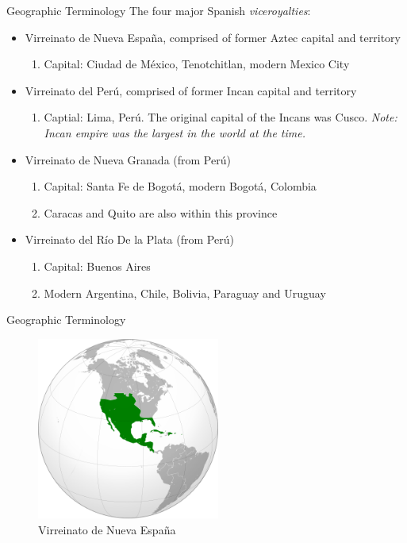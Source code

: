 \documentclass{beamer}
\begin{document}
\begin{frame}{Geographic Terminology}
\small
The four major Spanish \textit{viceroyalties}:
\begin{itemize}
\item Virreinato de Nueva Espa\~{n}a, comprised of former Aztec capital and territory
\begin{enumerate}
\item Capital: Ciudad de M\'{e}xico, Tenotchitlan, modern Mexico City
\end{enumerate}
\item Virreinato del Per\'{u}, comprised of former Incan capital and territory
\begin{enumerate}
\item Captial: Lima, Per\'{u}.  The original capital of the Incans was Cusco.  \textit{Note: Incan empire was the largest in the world at the time.}
\end{enumerate}
\item Virreinato de Nueva Granada (from Per\'{u})
\begin{enumerate}
\item Capital: Santa Fe de Bogot\'{a}, modern Bogot\'{a}, Colombia
\item Caracas and Quito are also within this province
\end{enumerate}
\item Virreinato del R\'{i}o De la Plata (from Per\'{u})
\begin{enumerate}
\item Capital: Buenos Aires
\item Modern Argentina, Chile, Bolivia, Paraguay and Uruguay
\end{enumerate}
\end{itemize}
\end{frame}

\begin{frame}{Geographic Terminology}
\begin{figure}
\includegraphics[width=6cm]{figures/vice_nuevaespana.png}
\caption{Virreinato de Nueva Espa\~{n}a}
\end{figure}
\end{frame}
\end{document}
